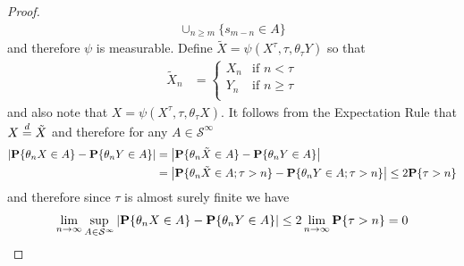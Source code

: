 \begin{proof}
\begin{align*}
\cup_{n \geq m} \lbrace s_{m-n} \in A \rbrace
\end{align*}
and therefore $\psi$ is measurable.  Define $\tilde{X} = \psi(X^\tau,
\tau, \theta_\tau Y)$ so that
\begin{align*}
\tilde{X}_n &= \begin{cases}
X_n & \text{if $n < \tau$} \\
Y_n & \text{if $n \geq \tau$} \\
\end{cases}
\end{align*}
and also note that $X = \psi(X^\tau, \tau, \theta_\tau X)$.  It
follows from the Expectation Rule that $X \overset{d}= \tilde{X}$ and
therefore for any $A \in \mathcal{S}^{\infty}$
\begin{align*}
\left \vert \textbf{P}\{\theta_n X \in A\} - \textbf{P}\{\theta_n Y \in A\}  \right \vert 
&=\left \vert \textbf{P}\{\theta_n \tilde{X} \in A\} - \textbf{P}\{\theta_n Y \in A\}  \right \vert \\
&=\left \vert \textbf{P}\{\theta_n \tilde{X} \in A; \tau > n\} -
  \textbf{P}\{\theta_n Y \in A; \tau > n\}  \right \vert 
\leq 2 \textbf{P}\{\tau > n\}
\end{align*}
and therefore since $\tau$ is almost surely finite we have
\begin{align*}
\lim_{n \to \infty} \sup_{A \in \mathcal{S}^{\infty}}
  \left \vert \textbf{P}\{\theta_n X \in A\} - \textbf{P}\{\theta_n Y \in A\}
   \right \vert \leq 2 \lim_{n \to \infty} \textbf{P}\{\tau > n\} = 0
\end{align*}
\end{proof}


